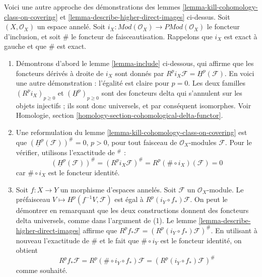 \begin{remark}

\label{remark-daniel}

Voici une autre approche des démonstrations des lemmes \ref{lemma-kill-cohomology-class-on-covering} et
\ref{lemma-describe-higher-direct-images} ci-dessus. Soit $(X, \mathcal{O}_X)$ un espace annelé. Soit $i_X : \textit{Mod}(\mathcal{O}_X) \to \textit{PMod}(\mathcal{O}_X)$
le foncteur d'inclusion, et soit $\#$ le foncteur de faisceautisation. Rappelons que $i_X$ est exact à gauche et que $\#$ est exact.

\begin{enumerate}

\item Démontrons d'abord le lemme \ref{lemma-include} ci-dessous, qui affirme que les foncteurs dérivés à droite de $i_X$ sont donnés par
$R^pi_X\mathcal{F} = \underline{H}^p(\mathcal{F})$. En voici une autre démonstration : l'égalité est claire pour $p = 0$. Les deux familles $(R^pi_X)_{p \geq 0}$ et $(\underline{H}^p)_{p \geq 0}$
sont des foncteurs delta qui s'annulent sur les objets injectifs ; ils sont donc universels, et par conséquent isomorphes. Voir Homologie, section \ref{homology-section-cohomological-delta-functor}.
\item Une reformulation du lemme \ref{lemma-kill-cohomology-class-on-covering}
est que $(\underline{H}^p(\mathcal{F}))^\# = 0$, $p > 0$, pour tout faisceau
de $\mathcal{O}_X$-modules $\mathcal{F}$. Pour le vérifier, utilisons l'exactitude de ${}^\#$ :
$$
(\underline{H}^p(\mathcal{F}))^\# =
(R^pi_X\mathcal{F})^\# =
R^p(\# \circ i_X)(\mathcal{F}) = 0
$$
car $\# \circ i_X$ est le foncteur identité.
\item Soit $f : X \to Y$ un morphisme d'espaces annelés. Soit $\mathcal{F}$ un $\mathcal{O}_X$-module. Le préfaisceau
$V \mapsto H^p(f^{-1}V, \mathcal{F})$ est égal à
$R^p (i_Y \circ f_*)\mathcal{F}$. On peut le démontrer en remarquant que les deux constructions donnent des foncteurs delta universels, comme dans l'argument de (1). Le lemme \ref{lemma-describe-higher-direct-images}
affirme que $R^p f_* \mathcal{F}= (R^p (i_Y \circ f_*)\mathcal{F})^\#$. En utilisant à nouveau l'exactitude de $\#$ et le fait que $\# \circ i_Y$ est le foncteur identité, on obtient
$$
R^p f_* \mathcal{F} =
R^p(\# \circ i_Y \circ f_*)\mathcal{F} =
(R^p (i_Y \circ f_*)\mathcal{F})^\#
$$
comme souhaité.

\end{enumerate}

\end{remark}






